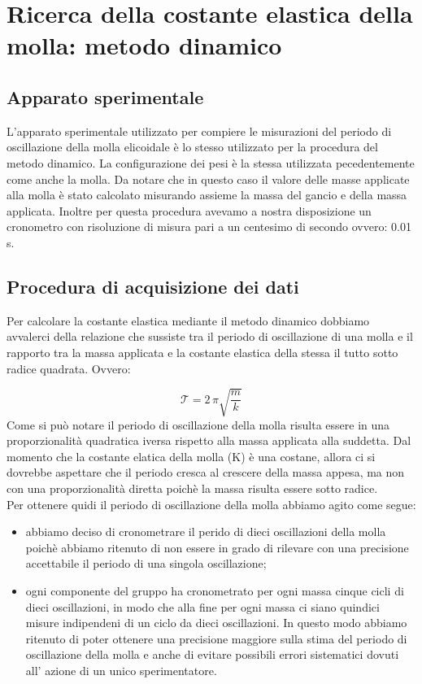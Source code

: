 \section{Ricerca della costante elastica della molla: metodo dinamico}

\subsection{Apparato sperimentale}
L'apparato sperimentale utilizzato per compiere le misurazioni del periodo di oscillazione della molla elicoidale è lo stesso utilizzato per la procedura del metodo dinamico. La configurazione dei pesi è la stessa utilizzata pecedentemente come anche la molla. Da notare che in questo caso il valore delle masse applicate alla molla è stato calcolato misurando assieme la massa del gancio e della massa applicata. Inoltre per questa procedura avevamo a nostra disposizione un cronometro con risoluzione di misura pari a un centesimo di secondo ovvero: 0.01 s.

\subsection{Procedura di acquisizione dei dati}
Per calcolare la costante elastica mediante il metodo dinamico dobbiamo avvalerci della relazione che sussiste tra il periodo di oscillazione di una molla e il rapporto tra la massa applicata e la costante elastica della stessa il tutto sotto radice quadrata. Ovvero:

\begin{equation}
	\mathcal{T} = {2\,\pi}{\sqrt{\frac{m}{k}}}
\end{equation}
%
Come si può notare il periodo di oscillazione della molla risulta essere in una proporzionalità quadratica iversa rispetto alla massa applicata alla suddetta. Dal momento che la costante elatica della molla (K) è una costane, allora ci si dovrebbe aspettare che il periodo cresca al crescere della massa appesa, ma non con una proporzionalità diretta poichè la massa risulta essere sotto radice.\\
Per ottenere quidi il periodo di oscillazione della molla abbiamo agito come segue:
\begin{itemize}
	\item{abbiamo deciso di cronometrare il perido di dieci oscillazioni della molla poichè abbiamo ritenuto di non essere in grado di rilevare con una precisione accettabile il periodo di una singola oscillazione;}
	\item{ogni componente del gruppo ha cronometrato per ogni massa cinque cicli di dieci oscillazioni, in modo che alla fine per ogni massa ci siano quindici misure indipendeni di un ciclo da dieci oscillazioni. In questo modo abbiamo ritenuto di poter ottenere una precisione maggiore sulla stima del periodo di oscillazione della molla e anche di evitare possibili errori sistematici dovuti all' azione di un unico sperimentatore.}
\end{itemize}

